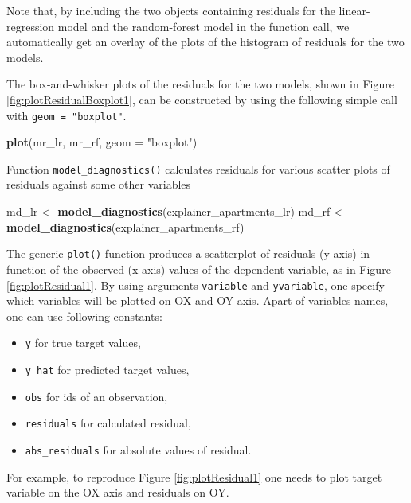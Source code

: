 \documentclass[]{krantz}
\newenvironment{Shaded}{\begin{snugshade}}{\end{snugshade}}
\newcommand{\DataTypeTok}[1]{\textcolor[rgb]{0.13,0.29,0.53}{#1}}
\newcommand{\KeywordTok}[1]{\textcolor[rgb]{0.13,0.29,0.53}{\textbf{#1}}}
\newcommand{\NormalTok}[1]{#1}
\newcommand{\StringTok}[1]{\textcolor[rgb]{0.31,0.60,0.02}{#1}}
\providecommand{\tightlist}{%
  \setlength{\itemsep}{0pt}\setlength{\parskip}{0pt}}
\begin{document}
Note that, by including the two objects containing residuals for the linear-regression model and the random-forest model in the function call, we automatically get an overlay of the plots of the histogram of residuals for the two models.

The box-and-whisker plots of the residuals for the two models, shown in Figure \ref{fig:plotResidualBoxplot1}, can be constructed by using the following simple call with \texttt{geom\ =\ "boxplot"}.

\begin{Shaded}
\begin{Highlighting}[]
\KeywordTok{plot}\NormalTok{(mr_lr, mr_rf, }\DataTypeTok{geom =} \StringTok{"boxplot"}\NormalTok{)}
\end{Highlighting}
\end{Shaded}

Function \texttt{model\_diagnostics()} calculates residuals for various scatter plots of residuals against some other variables

\begin{Shaded}
\begin{Highlighting}[]
\NormalTok{md_lr <-}\StringTok{ }\KeywordTok{model_diagnostics}\NormalTok{(explainer_apartments_lr)}
\NormalTok{md_rf <-}\StringTok{ }\KeywordTok{model_diagnostics}\NormalTok{(explainer_apartments_rf)}
\end{Highlighting}
\end{Shaded}

The generic \texttt{plot()} function produces a scatterplot of residuals (y-axis) in function of the observed (x-axis) values of the dependent variable, as in Figure \ref{fig:plotResidual1}. By using arguments \texttt{variable} and \texttt{yvariable}, one specify which variables will be plotted on OX and OY axis. Apart of variables names, one can use following constants:

\begin{itemize}
\tightlist
\item
  \texttt{y} for true target values,
\item
  \texttt{y\_hat} for predicted target values,
\item
  \texttt{obs} for ids of an observation,
\item
  \texttt{residuals} for calculated residual,
\item
  \texttt{abs\_residuals} for absolute values of residual.
\end{itemize}

For example, to reproduce Figure \ref{fig:plotResidual1} one needs to plot target variable on the OX axis and residuals on OY.
\end{document}
